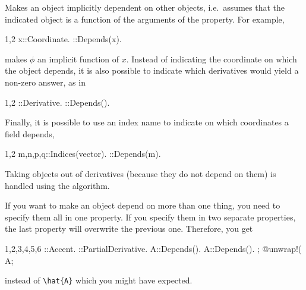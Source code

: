 
Makes an object implicitly dependent on other objects, i.e.~assumes
that the indicated object is a function of the arguments of the
property. For example,
\begin{screen}{1,2}
x::Coordinate.
\phi::Depends(x).
\end{screen}
makes $\phi$ an implicit function of $x$. Instead of indicating the
coordinate on which the object depends, it is also possible to
indicate which derivatives would yield a non-zero answer, as in
\begin{screen}{1,2}
\nabla{#}::Derivative.
\phi::Depends(\nabla).
\end{screen}
Finally, it is possible to use an index name to indicate on which
coordinates a field depends,
\begin{screen}{1,2}
{m,n,p,q}::Indices(vector).
\phi::Depends(m).
\end{screen}

Taking objects out of derivatives (because they do not depend on them)
is handled using the  algorithm.

If you want to make an object depend on more than one thing, you need
to specify them all in one  property. If you specify
them in two separate properties, the last property will overwrite
the previous one. Therefore, you get
\begin{screen}{1,2,3,4,5,6}
\hat{#}::Accent.
\partial{#}::PartialDerivative.
A::Depends(\hat).
A::Depends(\partial).
;
@unwrap!(%
A;
\end{screen}
instead of \verb|\hat{A}| which you might have expected.


